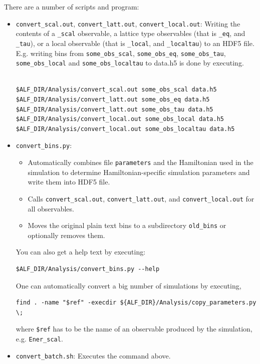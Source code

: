 There are a number of scripts and program:
\begin{itemize}
	\item \verb|convert_scal.out|, \verb|convert_latt.out|, \verb|convert_local.out|: Writing the contents of a \verb|_scal| observable, a lattice type observables (that is \verb|_eq|, and \verb|_tau|), or a local observable (that is \verb|_local|, and \verb|_localtau|) to an HDF5 file. E.g. writing bins from \verb|some_obs_scal|, \verb|some_obs_eq|, \verb|some_obs_tau|, \verb|some_obs_local| and \verb|some_obs_localtau| to data.h5 is done by executing.
	\vspace{-\baselineskip}
	\begin{lstlisting}[style=bash]

$ALF_DIR/Analysis/convert_scal.out some_obs_scal data.h5
$ALF_DIR/Analysis/convert_latt.out some_obs_eq data.h5
$ALF_DIR/Analysis/convert_latt.out some_obs_tau data.h5
$ALF_DIR/Analysis/convert_local.out some_obs_local data.h5
$ALF_DIR/Analysis/convert_local.out some_obs_localtau data.h5
	\end{lstlisting}
	\item \verb|convert_bins.py|: 
	\begin{itemize}
		\item Automatically combines file \verb|parameters| and the Hamiltonian used in the simulation to determine Hamiltonian-specific simulation parameters and write them into HDF5 file.
		\item Calls \verb|convert_scal.out|, \verb|convert_latt.out|, and \verb|convert_local.out| for all observables.
		\item Moves the original plain text bins to a subdirectory \verb|old_bins| or optionally removes them.
	\end{itemize}
	You can also get a help text by executing:
	\begin{lstlisting}[style=bash]
$ALF_DIR/Analysis/convert_bins.py --help
	\end{lstlisting}
	One can automatically convert a big number of simulations by executing,
	\begin{lstlisting}[style=bash]
find . -name "$ref" -execdir ${ALF_DIR}/Analysis/copy_parameters.py \;
	\end{lstlisting}
	where \verb|$ref| has to be the name of an observable produced by the simulation, e.g. \verb|Ener_scal|.
	\item \verb|convert_batch.sh|: Executes the command above.
\end{itemize}

